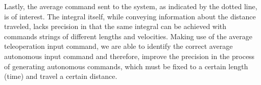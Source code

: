 \documentclass[letterpaper, 10 pt, conference]{ieeeconf}  %
\newcommand\NB[1]{$\spadesuit$\footnote{NB: #1}}
\begin{document}

Lastly, the average command sent to the system, as indicated by the dotted line, is of interest. The integral itself, while conveying information about the distance traveled, lacks precision in that the same integral can be achieved with commands strings of different lengths and velocities. Making use of the average teleoperation input command, we are able to identify the correct average autonomous input command and therefore, improve the precision in the process of generating autonomous commands, which must be fixed to a certain length (time) and travel a certain distance. 

\end{document}
